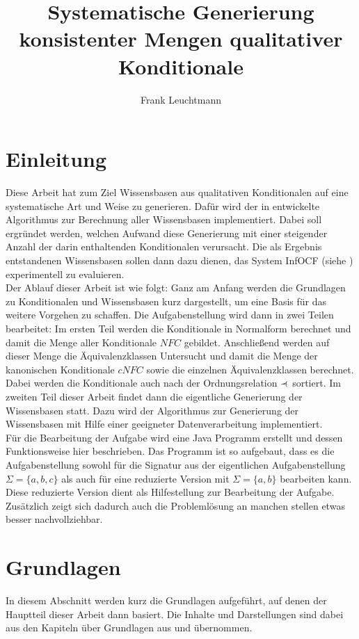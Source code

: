 \documentclass[12pt,a4paper]{article}
\author{Frank Leuchtmann}
\title{Systematische Generierung konsistenter Mengen qualitativer
Konditionale}
\newcommand\rdotl{\mathrel{%
    \mathchoice{\RQEQ}{\RQEQ}{\RQEQ}{\RQEQ}%
}}
\def\RQEQ{{%
    \setbox0\hbox{$\prec$}%
    \rlap{\hbox to \wd0{\hss \raisebox {0.01pt}{$\ \cdot$\hss}}}\box0
}}
\begin{document}
\maketitle
\newpage
\tableofcontents
\newpage


\section{Einleitung}
Diese Arbeit hat zum Ziel Wissensbasen aus qualitativen Konditionalen auf eine systematische Art und Weise zu generieren. Dafür wird der in \cite{beierle19} entwickelte Algorithmus zur Berechnung aller Wissensbasen implementiert. Dabei soll ergründet werden, welchen Aufwand diese Generierung mit einer steigender Anzahl der darin  enthaltenden Konditionalen verursacht. Die als Ergebnis entstandenen Wissensbasen sollen dann dazu dienen, das System InfOCF (siehe \cite{beierle17}) experimentell zu evaluieren. \\
Der Ablauf dieser Arbeit ist wie folgt: Ganz am Anfang werden die Grundlagen zu Konditionalen und Wissensbasen kurz dargestellt, um eine Basis für das weitere Vorgehen zu schaffen. Die Aufgabenstellung wird dann in zwei Teilen bearbeitet: Im ersten Teil werden die Konditionale in Normalform berechnet und damit die Menge aller Konditionale $NFC$ gebildet. Anschließend werden auf dieser Menge die Äquivalenzklassen Untersucht und damit die Menge der kanonischen Konditionale $cNFC$ sowie die einzelnen Äquivalenzklassen berechnet. Dabei werden die Konditionale auch nach der Ordnungsrelation $\rdotl$ sortiert. Im zweiten Teil dieser Arbeit findet dann die eigentliche Generierung der Wissensbasen statt. Dazu wird der Algorithmus zur Generierung der Wissensbasen mit Hilfe einer geeigneter Datenverarbeitung implementiert.\\
Für die Bearbeitung der Aufgabe wird eine Java Programm erstellt und dessen Funktionsweise hier beschrieben. Das Programm ist so aufgebaut, dass es die Aufgabenstellung sowohl für die Signatur aus der eigentlichen Aufgabenstellung $\Sigma = \{a,b,c\}$ als auch für eine reduzierte Version mit $\Sigma = \{a,b\}$ bearbeiten kann. Diese reduzierte Version dient als Hilfestellung zur Bearbeitung der Aufgabe. Zusätzlich zeigt sich dadurch auch die Problemlösung an manchen stellen etwas besser nachvollziehbar.
\section{Grundlagen}
In diesem Abschnitt werden kurz die Grundlagen aufgeführt, auf denen der Hauptteil dieser Arbeit dann basiert. Die Inhalte und Darstellungen sind dabei aus den Kapiteln über Grundlagen aus \cite{beierle19} und \cite{beierle17} übernommen.
\end{document}
